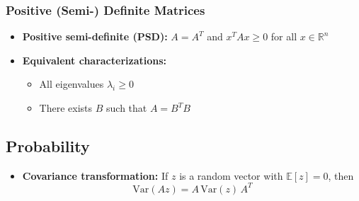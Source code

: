 \subsubsection{Positive (Semi-) Definite Matrices}
\begin{itemize}
      \item \textbf{Positive semi-definite (PSD):}
            \(A=A^T\) and
            \(\displaystyle x^T A x \ge0\) for all \(x\in\mathbb R^n\)
      \item \textbf{Equivalent characterizations:}
            \begin{itemize}
                  \item All eigenvalues \(\lambda_i\ge0\)
                  \item There exists \(B\) such that \(A = B^T B\)
            \end{itemize}
\end{itemize}

\subsection{Probability}
\begin{itemize}
      \item \textbf{Covariance transformation:}
            If \(z\) is a random vector with \(\mathbb E[z]=0\), then
            \vspace{-0.7em}
            \[
                  \mathrm{Var}(A z)
                  = A\,\mathrm{Var}(z)\,A^T
            \]
\end{itemize}

